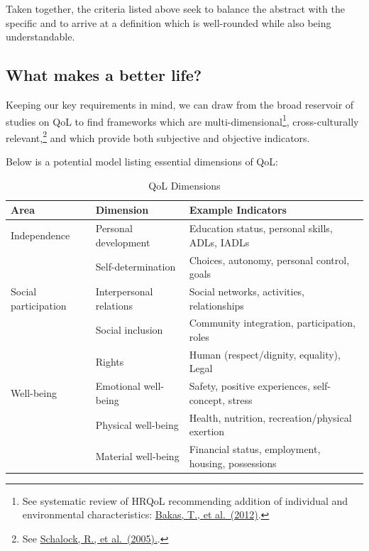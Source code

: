 \documentclass[
]{book}
\begin{document}
Taken together, the criteria listed above seek to balance the abstract with the specific and to arrive at a definition which is well-rounded while also being understandable.

\hypertarget{what-makes-a-better-life}{%
\subsection{What makes a better life?}\label{what-makes-a-better-life}}

Keeping our key requirements in mind, we can draw from the broad reservoir of studies on QoL to find frameworks which are multi-dimensional\footnote{See systematic review of HRQoL recommending addition of individual and environmental characteristics: \href{https://www.ncbi.nlm.nih.gov/pmc/articles/PMC3548743/}{Bakas, T., et al.~(2012)}.}, cross-culturally relevant,\footnote{See \href{https://www.researchgate.net/profile/Mian_Wang4/publication/7801771_Cross-Cultural_Study_of_Quality_of_Life_Indicators/links/0deec52df448eac34d000000/Cross-Cultural-Study-of-Quality-of-Life-Indicators.pdf}{Schalock, R., et al.~(2005).}.} and which provide both subjective and objective indicators.

Below is a potential model listing essential dimensions of QoL:

\begin{table}

\caption{\label{tab:unnamed-chunk-13}QoL Dimensions}
\centering
\begin{tabular}[t]{l|l|l}
\hline
Area & Dimension & Example Indicators\\
\hline
Independence & Personal development & Education status, personal skills, ADLs, IADLs\\
\hline
 & Self-determination & Choices, autonomy, personal control, goals\\
\hline
Social participation & Interpersonal relations & Social networks, activities, relationships\\
\hline
 & Social inclusion & Community integration, participation, roles\\
\hline
 & Rights & Human (respect/dignity, equality), Legal\\
\hline
Well-being & Emotional well-being & Safety, positive experiences, self-concept, stress\\
\hline
 & Physical well-being & Health, nutrition, recreation/physical exertion\\
\hline
 & Material well-being & Financial status, employment, housing, possessions\\
\hline
\end{tabular}
\end{table}
\end{document}
